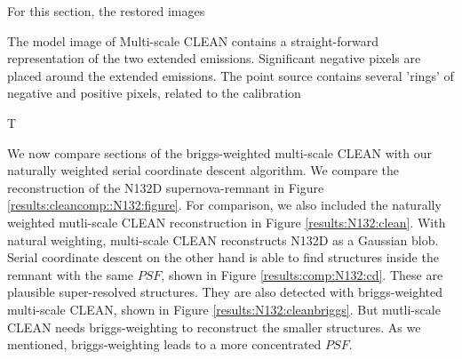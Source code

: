 For this section, the restored images

The model image of Multi-scale CLEAN contains a straight-forward representation of the two extended emissions. Significant negative pixels are placed around the extended emissions. The point source contains several 'rings' of negative and positive pixels, related to the calibration

T


We now compare sections of the briggs-weighted multi-scale CLEAN with our naturally weighted serial coordinate descent algorithm. We compare the reconstruction of the N132D supernova-remnant in Figure \ref{results:cleancomp::N132:figure}. For comparison, we also included the naturally weighted mutli-scale CLEAN reconstruction in Figure \ref{results:N132:clean}. With natural weighting, multi-scale CLEAN reconstructs N132D as a Gaussian blob. Serial coordinate descent on the other hand is able to find structures inside the remnant with the same $PSF$, shown in Figure \ref{results:comp:N132:cd}. These are plausible super-resolved structures. They are also detected with briggs-weighted multi-scale CLEAN, shown in Figure \ref{results:N132:cleanbriggs}. But mutli-scale CLEAN needs briggs-weighting to reconstruct the smaller structures. As we mentioned, briggs-weighting leads to a more concentrated $PSF$.



